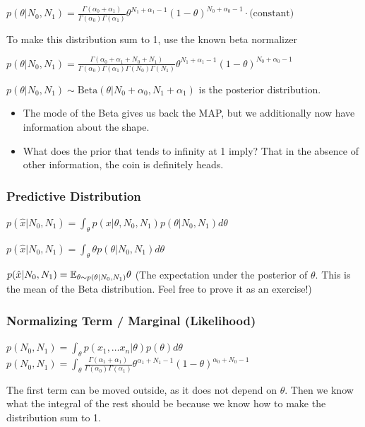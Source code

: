 \documentclass{article}
\begin{document}
$p(\theta|N_0,N_1) = \frac{\Gamma(\alpha_0 + \alpha_1)}{\Gamma(\alpha_0)\Gamma(\alpha_1)} \theta^{N_1 + \alpha_1-1} (1-\theta)^{N_0 + \alpha_0-1} \cdot \textrm{(constant)}$ 

To make this distribution sum to 1, use the known beta normalizer

$p(\theta|N_0,N_1) = \frac{\Gamma(\alpha_0 + \alpha_1 + N_0 + N_1)}{\Gamma(\alpha_0)\Gamma(\alpha_1)\Gamma(N_0)\Gamma(N_1)} \theta^{N_1 + \alpha_1-1} (1-\theta)^{N_0 + \alpha_0-1} $ 

$p(\theta|N_0,N_1) \sim \textrm{Beta}(\theta | N_0 + \alpha_0, N_1 + \alpha_1)$ is the posterior distribution.

\begin{itemize}
\item The mode of the Beta gives us back the MAP, but we additionally now have information about the shape.
\item What does the prior that tends to infinity at 1 imply? That in the absence of other information, the coin is definitely heads. 
\end{itemize}

\subsubsection*{Predictive Distribution}

$p(\hat{x}| N_0, N_1) = \int_\theta p(x|\theta, N_0, N_1) p(\theta | N_0, N_1) d\theta$

$p(\hat{x}| N_0, N_1) = \int_\theta \theta p(\theta | N_0, N_1) d\theta$

$p(\hat{x}| N_0, N_1) = \mathbb{E}_{\theta \sim p(\theta|N_0, N_1)} \theta$ (The expectation under the posterior of $\theta$. This is the mean of the Beta distribution. Feel free to prove it as an exercise!)

\subsubsection*{Normalizing Term / Marginal (Likelihood)}
$p(N_0, N_1) = \int_\theta p(x_1, \hdots x_n | \theta) p(\theta) d\theta$ \\
$p(N_0, N_1) = \int_\theta \frac{\Gamma( \alpha_1 +  \alpha_1)}{\Gamma(\alpha_0)\Gamma(\alpha_1)} \theta^{\alpha_1 + N_1 -1} (1-\theta)^{\alpha_0+N_0-1} $

The first term can be moved outside, as it does not depend on $\theta$. Then we know what the integral of the rest should be because we know how to make the distribution sum to 1.
\end{document}
